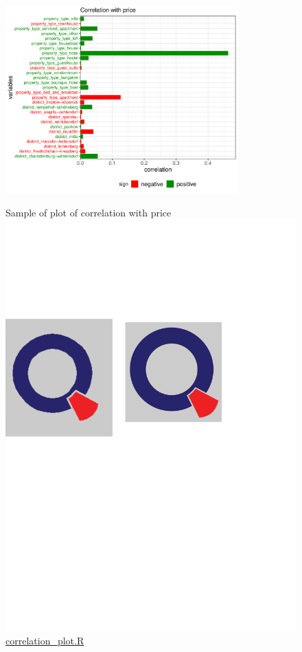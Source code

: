 \begin{figure}[H]
\begin{center}
\includegraphics[width=0.8\textwidth, keepaspectratio]{price_correlation.pdf} \\
\caption{Sample of plot of correlation with price \protect\includegraphics[scale=0.05]{qletlogo.pdf} {\href{https://github.com/silvia-ventoruzzo/SPL-WISE-2018/blob/master/Helpers/correlation_plot.R}{correlation\_plot.R}}}
\label{figure:pricecorr}
\end{center}
\end{figure}



